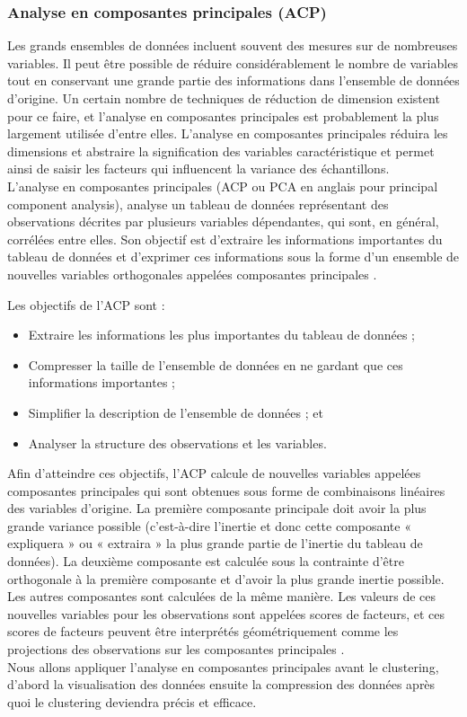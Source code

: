 \subsubsection{Analyse en composantes principales (ACP)}
Les grands ensembles de données incluent souvent des mesures sur de nombreuses variables. Il peut être possible de réduire considérablement le nombre de variables tout en conservant une grande partie des informations dans l'ensemble de données d'origine. Un certain nombre de techniques de réduction de dimension existent pour ce faire, et l'analyse en composantes principales est probablement la plus largement utilisée d'entre elles. L'analyse en composantes principales réduira les dimensions et abstraire la signification des variables caractéristique et permet ainsi de saisir les facteurs qui influencent la variance des échantillons. \\
L'analyse en composantes principales (ACP ou PCA en anglais pour principal component analysis), analyse un tableau de données représentant des observations décrites par plusieurs variables dépendantes, qui sont, en général, corrélées entre elles. Son objectif est d'extraire les informations importantes du tableau de données et d'exprimer ces informations sous la forme d'un ensemble de nouvelles variables orthogonales appelées composantes principales \cite{abdi2010principal}.

Les objectifs de l’ACP sont :
\begin{itemize}
	\item Extraire les informations les plus importantes du tableau de données ;
	\item Compresser la taille de l'ensemble de données en ne gardant que ces informations importantes ;
	\item Simplifier la description de l'ensemble de données ; et
	\item Analyser la structure des observations et les variables.
\end{itemize}
Afin d'atteindre ces objectifs, l'ACP calcule de nouvelles variables appelées composantes principales qui sont obtenues sous forme de combinaisons linéaires des variables d'origine. La première composante principale doit avoir la plus grande variance possible (c'est-à-dire l'inertie et donc cette composante « expliquera » ou « extraira » la plus grande partie de l'inertie du tableau de données). La deuxième composante est calculée sous la contrainte d'être orthogonale à la première composante et d'avoir la plus grande inertie possible. Les autres composantes sont calculées de la même manière. Les valeurs de ces nouvelles variables pour les observations sont appelées scores de facteurs, et ces scores de facteurs peuvent être interprétés géométriquement comme les projections des observations sur les composantes principales \cite{abdi2010principal}. \\
Nous allons appliquer l'analyse en composantes principales avant le clustering, d’abord la visualisation des données ensuite la compression des données après quoi le clustering deviendra précis et efficace.

